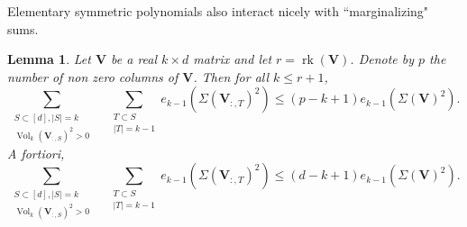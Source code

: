 \documentclass[twoside,11pt]{book}
\newtheorem{lemma}{Lemma}
\numberwithin{theorem}{chapter}
\numberwithin{definition}{chapter}
\numberwithin{proposition}{chapter}
\numberwithin{corollary}{chapter}
\numberwithin{example}{chapter}
\numberwithin{lemma}{chapter}
\numberwithin{assumption}{chapter}
\numberwithin{equation}{chapter}
\numberwithin{figure}{chapter}
\DeclareMathOperator{\rank}{\mathrm{rk}}
\DeclareMathOperator{\Vol}{Vol}
\begin{document}
Elementary symmetric polynomials also interact nicely with ``marginalizing" sums.
\begin{lemma}\label{sum_k_1_symmetric_poly_det_lemma}
Let $\bm{V}$ be a real $k \times d$ matrix and let $ r = \rank(\bm{V})$. Denote by $p$ the number of non zero columns of $\bm{V}$. Then for all $k\leq r+1$,
\begin{equation}
    \sum\limits_{\substack{S \subset [d], |S| = k\\\Vol_{k}(\bm{V}_{:,S})^{2} >0}} \quad \sum\limits_{\substack{T \subset S \\ |T| = k-1}} e_{k-1}(\Sigma(\bm{V}_{:,T})^{2}) \leq (p-k+1)e_{k-1}(\Sigma(\bm{V})^{2}).
\end{equation}
A fortiori,
\begin{equation}
    \sum\limits_{\substack{S \subset [d], |S| = k\\\Vol_{k}(\bm{V}_{:,S})^{2} >0}} \quad \sum\limits_{\substack{T \subset S \\ |T| = k-1}} e_{k-1}(\Sigma(\bm{V}_{:,T})^{2}) \leq (d-k+1)e_{k-1}(\Sigma(\bm{V})^{2}).
\end{equation}
\end{lemma}
\end{document}
